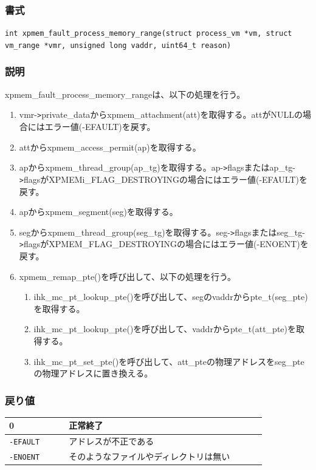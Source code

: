 \documentclass[twoside,11pt,fleqn]{book}
\begin{document}
\subsubsection*{書式}{\quad}
\texttt{int xpmem\_fault\_process\_memory\_range(struct process\_vm *vm,
        struct vm\_range *vmr,
        unsigned long vaddr,
        uint64\_t reason)
}

\subsubsection*{説明}{\quad}
xpmem\_fault\_process\_memory\_rangeは、以下の処理を行う。
\begin{enumerate}
  \item vmr-\verb|>|private\_dataからxpmem\_attachment(att)を取得する。attがNULLの場合にはエラー値(-EFAULT)を戻す。
  \item attからxpmem\_access\_permit(ap)を取得する。
  \item apからxpmem\_thread\_group(ap\_tg)を取得する。ap-\verb|>|flagsまたはap\_tg-\verb|>|flagsがXPMEMi\_FLAG\_DESTROYINGの場合にはエラー値(-EFAULT)を戻す。
  \item apからxpmem\_segment(seg)を取得する。
  \item segからxpmem\_thread\_group(seg\_tg)を取得する。seg-\verb|>|flagsまたはseg\_tg-\verb|>|flagsがXPMEM\_FLAG\_DESTROYINGの場合にはエラー値(-ENOENT)を戻す。
  \item xpmem\_remap\_pte()を呼び出して、以下の処理を行う。
  \begin{enumerate}
    \item ihk\_mc\_pt\_lookup\_pte()を呼び出して、segのvaddrからpte\_t(seg\_pte)を取得する。
    \item ihk\_mc\_pt\_lookup\_pte()を呼び出して、vaddrからpte\_t(att\_pte)を取得する。
    \item ihk\_mc\_pt\_set\_pte()を呼び出して、att\_pteの物理アドレスをseg\_pteの物理アドレスに置き換える。
  \end{enumerate}
\end{enumerate}

\subsubsection*{戻り値}{\quad}
\begin{table}[!h]
\footnotesize
\begin{tabular}{|p{0.20\linewidth}|p{0.66\linewidth}|} \hline
0&正常終了\\ \hline
\texttt{-EFAULT}&アドレスが不正である\\ \hline
\texttt{-ENOENT}&そのようなファイルやディレクトリは無い\\ \hline
\end{tabular}
\vspace{-0em}
\end{table}
\FloatBarrier
\end{document}

